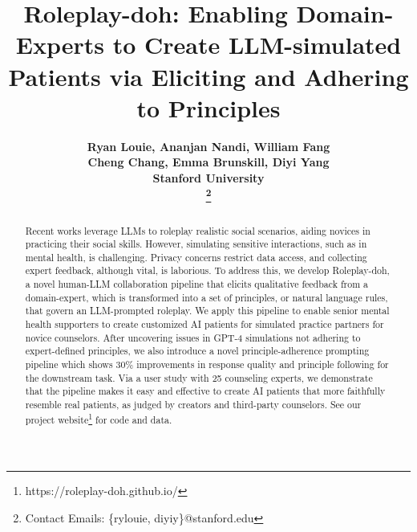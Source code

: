 \documentclass[11pt]{article}
\title{Roleplay-doh: Enabling Domain-Experts to Create LLM-simulated\\ Patients via Eliciting and Adhering to Principles}
\author{\bf \hypersetup{linkcolor=black}
Ryan Louie, Ananjan Nandi, William Fang \\
\bf \hypersetup{linkcolor=black}
Cheng Chang, Emma Brunskill, Diyi Yang \\
Stanford University\\ 
\thanks{Contact Emails: \{rylouie, diyiy\}@stanford.edu}
        }
\begin{document}
\maketitle
\begin{abstract}
Recent works leverage LLMs to roleplay realistic social scenarios, aiding novices in practicing their social skills. However, simulating sensitive interactions, such as in mental health, is challenging. Privacy concerns restrict data access, and collecting expert feedback, although vital, is laborious.
To address this, we develop Roleplay-doh, a novel human-LLM collaboration pipeline that elicits qualitative feedback from a domain-expert, which is transformed into a set of principles, or natural language rules, that govern an LLM-prompted roleplay. 
We apply this pipeline to enable senior mental health supporters to create customized AI patients for simulated practice partners for novice counselors. After uncovering issues in GPT-4 simulations not adhering to expert-defined principles, we also introduce a novel principle-adherence prompting pipeline which shows 30\% improvements in response quality and principle following for the downstream task.  Via a user study with 25 counseling experts, we demonstrate that the pipeline makes it easy and effective to create AI patients that more faithfully resemble real patients, as judged by creators and third-party counselors. See our project website\footnote{https://roleplay-doh.github.io/} for code and data.


\end{abstract}
\end{document}

